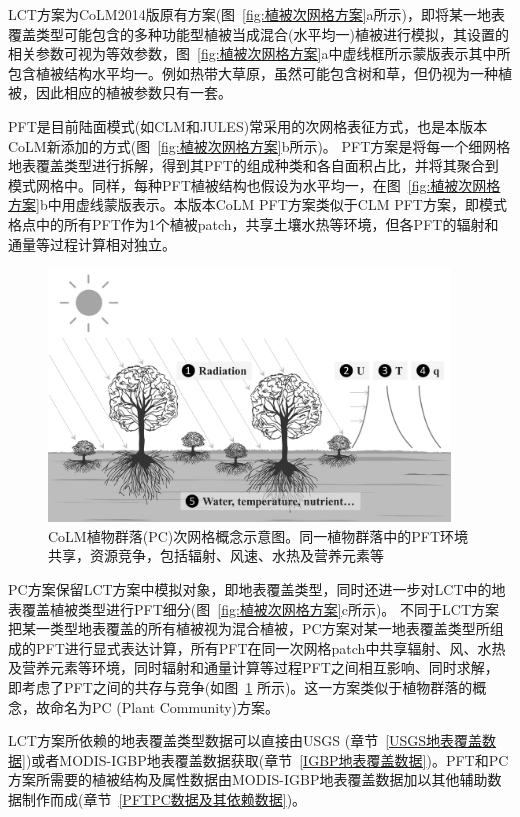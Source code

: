 LCT方案为CoLM2014版原有方案(图~\ref{fig:植被次网格方案}a所示)，即将某一地表覆盖类型可能包含的多种功能型植被当成混合(水平均一)植被进行模拟，其设置的相关参数可视为等效参数，图~\ref{fig:植被次网格方案}a中虚线框所示蒙版表示其中所包含植被结构水平均一。例如热带大草原，虽然可能包含树和草，但仍视为一种植被，因此相应的植被参数只有一套。

PFT是目前陆面模式(如CLM和JULES)常采用的次网格表征方式，也是本版本CoLM新添加的方式(图~\ref{fig:植被次网格方案}b所示)。
PFT方案是将每一个细网格地表覆盖类型进行拆解，得到其PFT的组成种类和各自面积占比，并将其聚合到模式网格中。同样，每种PFT植被结构也假设为水平均一，在图~\ref{fig:植被次网格方案}b中用虚线蒙版表示。本版本CoLM PFT方案类似于CLM PFT方案，即模式格点中的所有PFT作为1个植被patch，共享土壤水热等环境，但各PFT的辐射和通量等过程计算相对独立。

{
  \begin{figure}[htbp]
    \centering
    \includegraphics[width=0.95\textwidth]{Figures/模式构架/植物群落示意图.png}
    \caption[CoLM植物群落(PC)次网格概念示意图]{CoLM植物群落(PC)次网格概念示意图。同一植物群落中的PFT环境共享，资源竞争，包括辐射、风速、水热及营养元素等}
    \label{fig:植物群落示意图}
  \end{figure}
}

PC方案保留LCT方案中模拟对象，即地表覆盖类型，同时还进一步对LCT中的地表覆盖植被类型进行PFT细分(图~\ref{fig:植被次网格方案}c所示)。
不同于LCT方案把某一类型地表覆盖的所有植被视为混合植被，PC方案对某一地表覆盖类型所组成的PFT进行显式表达计算，所有PFT在同一次网格patch中共享辐射、风、水热及营养元素等环境，同时辐射和通量计算等过程PFT之间相互影响、同时求解，即考虑了PFT之间的共存与竞争(如图~\ref{fig:植物群落示意图} 所示)。这一方案类似于植物群落的概念，故命名为PC (Plant Community)方案。

LCT方案所依赖的地表覆盖类型数据可以直接由USGS (章节~\ref{USGS地表覆盖数据})或者MODIS-IGBP地表覆盖数据获取(章节~\ref{IGBP地表覆盖数据})。PFT和PC方案所需要的植被结构及属性数据由MODIS-IGBP地表覆盖数据加以其他辅助数据制作而成(章节~\ref{PFTPC数据及其依赖数据})。

